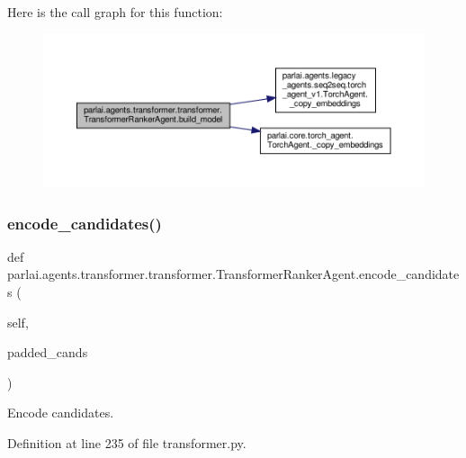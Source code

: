 Here is the call graph for this function\+:
\nopagebreak
\begin{figure}[H]
\begin{center}
\leavevmode
\includegraphics[width=350pt]{classparlai_1_1agents_1_1transformer_1_1transformer_1_1TransformerRankerAgent_a3336fdab2d667e6e631135ec70e8558f_cgraph}
\end{center}
\end{figure}
\mbox{\label{classparlai_1_1agents_1_1transformer_1_1transformer_1_1TransformerRankerAgent_a6067345dff7fefda2809ea3bd63cd8fd}} 
\subsubsection{\texorpdfstring{encode\+\_\+candidates()}{encode\_candidates()}}
{\footnotesize\ttfamily def parlai.\+agents.\+transformer.\+transformer.\+Transformer\+Ranker\+Agent.\+encode\+\_\+candidates (\begin{DoxyParamCaption}\item[{}]{self,  }\item[{}]{padded\+\_\+cands }\end{DoxyParamCaption})}

\begin{DoxyVerb}Encode candidates.\end{DoxyVerb}
 

Definition at line 235 of file transformer.\+py.



